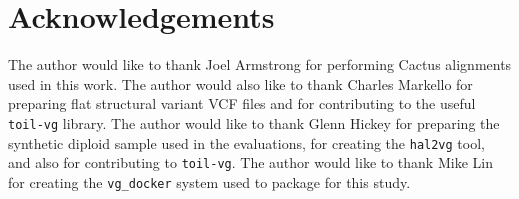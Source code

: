 \section{Acknowledgements}

The author would like to thank Joel Armstrong for performing Cactus alignments used in this work. The author would also like to thank Charles Markello for preparing flat structural variant VCF files and for contributing to the useful \texttt{toil-vg} library. The author would like to thank Glenn Hickey for preparing the synthetic diploid sample used in the evaluations, for creating the \texttt{hal2vg} tool, and also for contributing to \texttt{toil-vg}. The author would like to thank Mike Lin for creating the \texttt{vg\_docker} system used to package \vg for this study.

        
            
